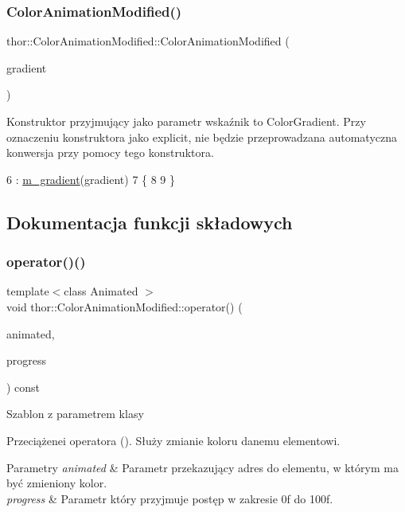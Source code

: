 \subsubsection{\texorpdfstring{Color\+Animation\+Modified()}{ColorAnimationModified()}}
{\footnotesize\ttfamily thor\+::\+Color\+Animation\+Modified\+::\+Color\+Animation\+Modified (\begin{DoxyParamCaption}\item[{Color\+Gradient $\ast$}]{gradient }\end{DoxyParamCaption})\hspace{0.3cm}{\ttfamily [explicit]}}

Konstruktor przyjmujący jako parametr wskaźnik to Color\+Gradient. Przy oznaczeniu konstruktora jako explicit, nie będzie przeprowadzana automatyczna konwersja przy pomocy tego konstruktora. 
\begin{DoxyCode}
6                                                                              :
      \mbox{\hyperlink{classthor_1_1_color_animation_modified_abf68739bcf2c9d31b3165a82e0e617c7}{m\_gradient}}(gradient)
7 \{
8 
9 \}
\end{DoxyCode}


\subsection{Dokumentacja funkcji składowych}
\mbox{\label{classthor_1_1_color_animation_modified_a1e37d889370f0e3f9686b9265cac2dba}} 
\subsubsection{\texorpdfstring{operator()()}{operator()()}}
{\footnotesize\ttfamily template$<$class Animated $>$ \\
void thor\+::\+Color\+Animation\+Modified\+::operator() (\begin{DoxyParamCaption}\item[{Animated \&}]{animated,  }\item[{float}]{progress }\end{DoxyParamCaption}) const}

Szablon z parametrem klasy

Przeciążenei operatora (). Służy zmianie koloru danemu elementowi. 
\begin{DoxyParams}{Parametry}
{\em animated} & Parametr przekazujący adres do elementu, w którym ma być zmieniony kolor. \\
\hline
{\em progress} & Parametr który przyjmuje postęp w zakresie 0f do 100f. \\
\hline
\end{DoxyParams}

